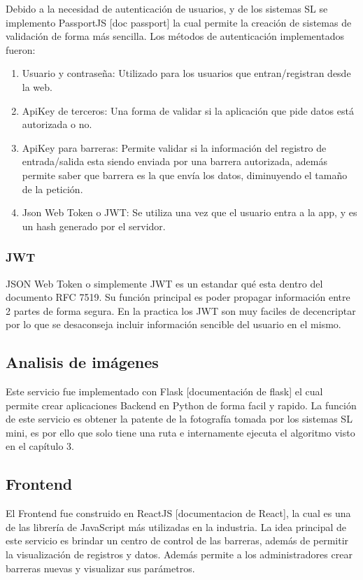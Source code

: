 Debido a la necesidad de autenticación de usuarios, y de los sistemas SL se implemento PassportJS [doc passport] la cual permite la creación de sistemas de validación de forma más sencilla. Los métodos de autenticación implementados fueron:

\begin{enumerate}
    \item Usuario y contraseña: Utilizado para los usuarios que entran/registran desde la web.
    \item ApiKey de terceros: Una forma de validar si la aplicación que pide datos está autorizada o no.
    \item ApiKey para barreras: Permite validar si la información del registro de entrada/salida esta siendo enviada por una barrera autorizada, además permite saber que barrera es la que envía los datos, diminuyendo el tamaño de la petición.
    \item Json Web Token o JWT: Se utiliza una vez que el usuario entra a la app, y es un hash generado por el servidor.
\end{enumerate}

\subsubsection*{JWT}

JSON Web Token o simplemente JWT es un estandar qué esta dentro del documento RFC 7519. Su función principal es poder propagar información entre 2 partes de forma segura. En la practica los JWT son muy faciles de decencriptar por lo que se desaconseja incluir información sencible del usuario en el mismo.

\subsection{Analisis de imágenes}

Este servicio fue implementado con Flask [documentación de flask] el cual permite crear aplicaciones Backend en Python de forma facil y rapido. La función de este servicio es obtener la patente de la fotografía tomada por los sistemas SL mini, es por ello que solo tiene una ruta e internamente ejecuta el algoritmo visto en el capítulo 3.

\subsection{Frontend}

El Frontend fue construido en ReactJS [documentacion de React], la cual es una de las librería de JavaScript más utilizadas en la industria. La idea principal de este servicio es brindar un centro de control de las barreras, además de permitir la visualización de registros y datos. Además permite a los administradores crear barreras nuevas y visualizar sus parámetros.

